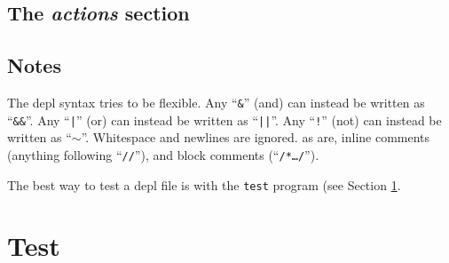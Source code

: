 \documentclass{article}
\begin{document}
\subsection{The \emph{actions} section}

\subsection{Notes}

The depl syntax tries to be flexible.
Any
``\texttt{\&}''
(and) can instead be written as
``\texttt{\&\&}''.
Any
``\texttt{|}''
(or) can instead be written as
``\texttt{||}''.
Any
``\texttt{!}''
(not) can instead be written as
``$\sim$''.
Whitespace and newlines are ignored.
as are, inline comments (anything
following ``\texttt{//}''), and block comments (``\texttt{/*\ldots*/}'').

The best way to test a depl file is with the \verb|test| program (see Section
\ref{sec:test}.

\section{Test}
\label{sec:test}
\end{document}
